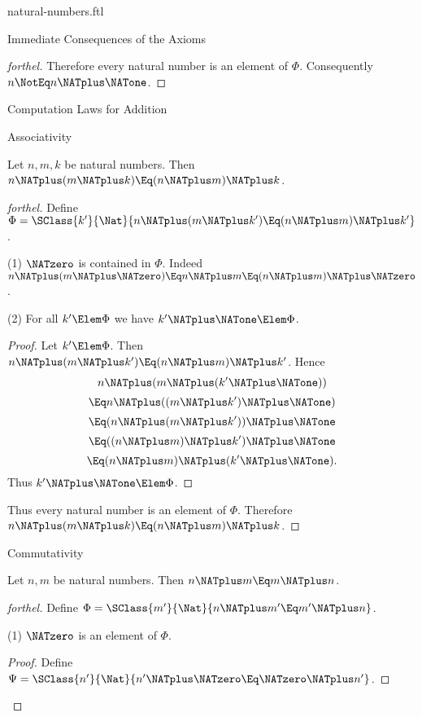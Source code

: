 \documentclass{stex}
\begin{document}
\begin{smodule}{natural-numbers.ftl}
\begin{sfragment}{Immediate Consequences of the Axioms}
\begin{proof}[forthel]
    Therefore every natural number is an element of $\Phi$.
    Consequently $n \NotEq n \NATplus \NATone$.
  \end{proof}
\end{sfragment}

\begin{sfragment}{Computation Laws for Addition}
  \begin{sfragment}{Associativity}
    \begin{proposition}[forthel]
      Let $n, m, k$ be natural numbers.
      Then $n \NATplus (m \NATplus k) \Eq (n \NATplus m) \NATplus k$.
    \end{proposition}
    \begin{proof}[forthel]
      Define $\Phi = \SClass{k'}{\Nat}{n \NATplus (m \NATplus k') \Eq (n \NATplus m) \NATplus k'}$.

      (1) $\NATzero$ is contained in $\Phi$.
      Indeed $n \NATplus (m \NATplus \NATzero) \Eq n \NATplus m \Eq (n \NATplus m) \NATplus \NATzero$.

      (2) For all $k' \Elem \Phi$ we have $k' \NATplus \NATone \Elem \Phi$.
      \begin{proof}
        Let $k' \Elem \Phi$.
        Then $n \NATplus (m \NATplus k') \Eq (n \NATplus m) \NATplus k'$.
        Hence
        \[  n \NATplus (m \NATplus (k' \NATplus \NATone))        \]
        \[    \Eq n \NATplus ((m \NATplus k') \NATplus \NATone)    \]
        \[    \Eq (n \NATplus (m \NATplus k')) \NATplus \NATone    \]
        \[    \Eq ((n \NATplus m) \NATplus k') \NATplus \NATone    \]
        \[    \Eq (n \NATplus m) \NATplus (k' \NATplus \NATone).   \]
        Thus $k' \NATplus \NATone \Elem \Phi$.
      \end{proof}

      Thus every natural number is an element of $\Phi$.
      Therefore $n \NATplus (m \NATplus k) \Eq (n \NATplus m) \NATplus k$.
    \end{proof}
  \end{sfragment}

  \begin{sfragment}{Commutativity}
    \begin{proposition}[forthel]
      Let $n, m$ be natural numbers.
      Then $n \NATplus m \Eq m \NATplus n$.
    \end{proposition}
    \begin{proof}[forthel]
      Define $\Phi = \SClass{m'}{\Nat}{n \NATplus m' \Eq m' \NATplus n}$.

      (1) $\NATzero$ is an element of $\Phi$.
      \begin{proof}
        Define $\Psi = \SClass{n'}{\Nat}{n' \NATplus \NATzero \Eq \NATzero \NATplus n'}$.


\end{proof}
\end{proof}
\end{sfragment}
\end{sfragment}
\end{smodule}
\end{document}
